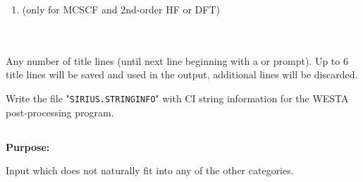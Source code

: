 \begin{description}
\begin{enumerate}
\item \hspace{2em}  (only for MCSCF and 2nd-order HF or DFT)
\end{enumerate}

\item[\Key{TITLE}]  \ \\
   \ \\ 
  Any number of title lines (until next line beginning with a
   or \quotekw{*} prompt).
  Up to 6 title lines will be saved and used in the output, additional
  lines will be discarded.

\item[\Key{WESTA}]
  Write the file "\verb|SIRIUS.STRINGINFO|" with CI string information for the WESTA post-processing program.

\end{description}




\pagebreak[3]
\subsection{\label{ref-auxinp}}

{\bf Purpose:}

Input which does not naturally fit into any of the other
categories.

